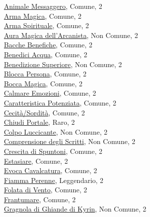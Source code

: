 \begin{multicols}{3}
{{\hyperlink{Animale Messaggero}{Animale Messaggero}, Comune, 2\\
\hyperlink{Arma Magica}{Arma Magica}, Comune, 2\\
\hyperlink{Arma Spirituale}{Arma Spirituale}, Comune, 2\\
\hyperlink{Aura Magica dell'Arcanista}{Aura Magica dell'Arcanista}, Non Comune, 2\\
\hyperlink{Bacche Benefiche}{Bacche Benefiche}, Comune, 2\\
\hyperlink{Benedici Acqua}{Benedici Acqua}, Comune, 2\\
\hyperlink{Benedizione Superiore}{Benedizione Superiore}, Non Comune, 2\\
\hyperlink{Blocca Persona}{Blocca Persona}, Comune, 2\\
\hyperlink{Bocca Magica}{Bocca Magica}, Comune, 2\\
\hyperlink{Calmare Emozioni}{Calmare Emozioni}, Comune, 2\\
\hyperlink{Caratteristica Potenziata}{Caratteristica Potenziata}, Comune, 2\\
\hyperlink{Cecità/Sordità}{Cecità/Sordità}, Comune, 2\\
\hyperlink{Chiudi Portale}{Chiudi Portale}, Raro, 2\\
\hyperlink{Colpo Luccicante}{Colpo Luccicante}, Non Comune, 2\\
\hyperlink{Comprensione degli Scritti}{Comprensione degli Scritti}, Non Comune, 2\\
\hyperlink{Crescita di Spuntoni}{Crescita di Spuntoni}, Comune, 2\\
\hyperlink{Estasiare}{Estasiare}, Comune, 2\\
\hyperlink{Evoca Cavalcatura}{Evoca Cavalcatura}, Comune, 2\\
\hyperlink{Fiamma Perenne}{Fiamma Perenne}, Leggendario, 2\\
\hyperlink{Folata di Vento}{Folata di Vento}, Comune, 2\\
\hyperlink{Frantumare}{Frantumare}, Comune, 2\\
\hyperlink{Gragnola di Ghiande di Kyrin}{Gragnola di Ghiande di Kyrin}, Non Comune, 2\\
}}
\end{multicols}
